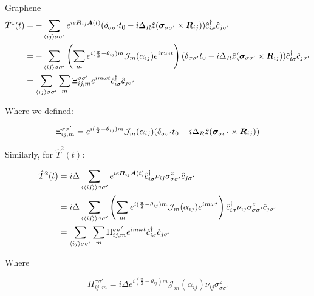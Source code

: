 \begin{section}{Graphene}
\begin{align*}
\hat{T}^1(t) &= -\sum_{\langle i j \rangle \sigma \sigma'} e^{ie\boldsymbol{R}_{ij}\boldsymbol{A}(t)} (\delta_{\sigma \sigma'}t_0 - i\Delta_R \hat{z}(\boldsymbol{\sigma}_{\sigma \sigma'} \times \boldsymbol{R}_{ij})) \hat{c}^{\dagger}_{i\sigma}\hat{c}_{j\sigma'} \nonumber \\
&= -\sum_{\langle i j \rangle \sigma \sigma'} \left( \sum_m e^{i(\frac{\pi}{2}-\theta_{ij})m} \mathcal{J}_m(\alpha_{ij}) e^{im\omega t} \right) (\delta_{\sigma \sigma'}t_0 - i\Delta_R \hat{z}(\boldsymbol{\sigma}_{\sigma \sigma'} \times \boldsymbol{R}_{ij})) \hat{c}^{\dagger}_{i\sigma}\hat{c}_{j\sigma'} \nonumber \\
&= \sum_{\langle i j \rangle \sigma \sigma'} \sum_m  \Xi_{ij,m}^{\sigma \sigma'} e^{im\omega t}\hat{c}^{\dagger}_{i\sigma}\hat{c}_{j\sigma'}
\end{align*}

Where we defined:

\begin{equation}
 \Xi_{ij,m}^{\sigma \sigma'} = e^{i(\frac{\pi}{2}-\theta_{ij})m} \mathcal{J}_m(\alpha_{ij})(\delta_{\sigma \sigma'}t_0 - i\Delta_R \hat{z}(\boldsymbol{\sigma}_{\sigma \sigma'} \times \boldsymbol{R}_{ij}))
\end{equation}

Similarly, for $\hat{T}^2(t)$:

\begin{align*}
\hat{T}^2(t) &= i\Delta \sum_{\langle \langle i j \rangle \rangle \sigma \sigma'}  e^{ie\boldsymbol{R}_{ij}\boldsymbol{A}(t)} \hat{c}^{\dagger}_{i\sigma} \nu_{ij} \sigma^z_{\sigma \sigma'} \hat{c}_{j\sigma'} \\
&= i\Delta \sum_{\langle \langle i j \rangle \rangle \sigma \sigma'}  \left( \sum_m e^{i(\frac{\pi}{2}-\theta_{ij})m} \mathcal{J}_m(\alpha_{ij}) e^{im\omega t} \right) \hat{c}^{\dagger}_{i\sigma} \nu_{ij} \sigma^z_{\sigma \sigma'} \hat{c}_{j\sigma'} \\
&= \sum_{\langle i j \rangle \sigma \sigma'} \sum_m  \Pi_{ij,m}^{\sigma \sigma'} e^{im\omega t}\hat{c}^{\dagger}_{i\sigma}\hat{c}_{j\sigma'}
\end{align*}

Where

\begin{equation}
\Pi_{ij,m}^{\sigma \sigma'} = i \Delta e^{i(\frac{\pi}{2}-\theta_{ij})m} \mathcal{J}_m(\alpha_{ij}) \nu_{ij} \sigma_{\sigma \sigma'}^z
\end{equation}


\end{section}
